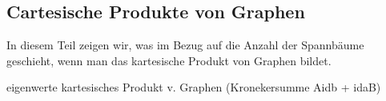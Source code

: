 \subsection{Cartesische Produkte von Graphen}
In diesem Teil zeigen wir, was im Bezug auf die Anzahl der Spannbäume geschieht, wenn man das kartesische Produkt von Graphen bildet. %
\begin{Lm}
eigenwerte kartesisches Produkt v. Graphen (Kronekersumme Aidb + idaB)
\end{Lm}
